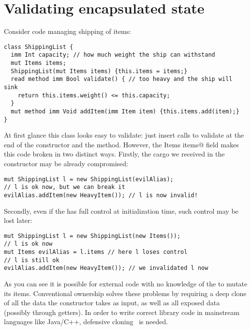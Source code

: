 \saveSpace
\section{Validating encapsulated state}
\label{s:encapsulated}
\saveSpace




Consider code managing shipping of items:
\saveSpace
\begin{lstlisting}
class ShippingList {
  imm Int capacity; // how much weight the ship can withstand
  mut Items items;
  ShippingList(mut Items items) {this.items = items;}
  read method imm Bool validate() {	// too heavy and the ship will sink
    return this.items.weight() <= this.capacity;
  }
  mut method imm Void addItem(imm Item item) {this.items.add(item);}
}
\end{lstlisting}
\saveSpace
At first glance this class looks easy to validate: just insert calls to validate at the end of the constructor and the \Q@addItem@ method.
However, the \Q@mut Items items@ field makes this code broken in two distinct ways.
Firstly, the cargo we received in the constructor may be already compromised:
\saveSpace
\begin{lstlisting}
mut ShippingList l = new ShippingList(evilAlias);
// l is ok now, but we can break it
evilAlias.addItem(new HeavyItem()); // l is now invalid!
\end{lstlisting}
\saveSpace 
Secondly, even if the \Q@ShippingList@ has full control at initialization time, such control may be lost later:
\saveSpace
\begin{lstlisting}
mut ShippingList l = new ShippingList(new Items());
// l is ok now
mut Items evilAlias = l.items // here l loses control
// l is still ok
evilAlias.addItem(new HeavyItem()); // we invalidated l now
\end{lstlisting}
\saveSpace
As you can see it is possible for external code with no knowledge of the \Q@ShippingList@ to mutate its items.
Conventional ownership solves these problems by requiring a deep clone of all the data the constructor takes as input, as well as all exposed data (possibly through getters).
In order to write correct library code in mainstream languages like Java/C++, defensive cloning~\cite{Bloch08} is needed.

